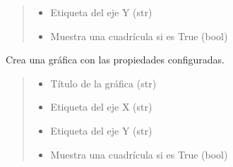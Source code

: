 \documentclass[letterpaper,10pt,spanish]{sphinxmanual}
\begin{document}
\begin{fulllineitems}
\begin{fulllineitems}
\begin{quote}
\begin{description}
\begin{itemize}
\item {} 
\sphinxAtStartPar
{} \textendash{} Etiqueta del eje Y (str)

\item {} 
\sphinxAtStartPar
{} \textendash{} Muestra una cuadrícula si es True (bool)

\end{itemize}

\end{description}\end{quote}

\end{fulllineitems}


\begin{fulllineitems}
\label{\detokenize{pr8:pr8.2.DataPlotter.plot}}
\pysigstartsignatures
{}
\pysigstopsignatures
\sphinxAtStartPar
Crea una gráfica con las propiedades configuradas.
\begin{quote}\begin{description}
\begin{itemize}
\item {} 
\sphinxAtStartPar
{} \textendash{} Título de la gráfica (str)

\item {} 
\sphinxAtStartPar
{} \textendash{} Etiqueta del eje X (str)

\item {} 
\sphinxAtStartPar
{} \textendash{} Etiqueta del eje Y (str)

\item {} 
\sphinxAtStartPar
{} \textendash{} Muestra una cuadrícula si es True (bool)


\end{itemize}
\end{description}
\end{quote}
\end{fulllineitems}
\end{fulllineitems}
\end{document}
